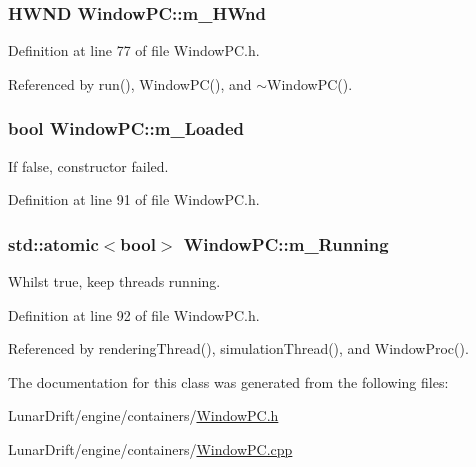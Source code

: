 \subsubsection[{\texorpdfstring{m\+\_\+\+H\+Wnd}{m_HWnd}}]{\setlength{\rightskip}{0pt plus 5cm}H\+W\+ND Window\+P\+C\+::m\+\_\+\+H\+Wnd\hspace{0.3cm}{\ttfamily [private]}}\hypertarget{class_window_p_c_a49b7d0fb393f4316e78dc753946fd5f9}{}\label{class_window_p_c_a49b7d0fb393f4316e78dc753946fd5f9}


Definition at line 77 of file Window\+P\+C.\+h.



Referenced by run(), Window\+P\+C(), and $\sim$\+Window\+P\+C().

\subsubsection[{\texorpdfstring{m\+\_\+\+Loaded}{m_Loaded}}]{\setlength{\rightskip}{0pt plus 5cm}bool Window\+P\+C\+::m\+\_\+\+Loaded\hspace{0.3cm}{\ttfamily [private]}}\hypertarget{class_window_p_c_a8fa7bd25448521da92f5b12a45392ded}{}\label{class_window_p_c_a8fa7bd25448521da92f5b12a45392ded}


If false, constructor failed. 



Definition at line 91 of file Window\+P\+C.\+h.

\subsubsection[{\texorpdfstring{m\+\_\+\+Running}{m_Running}}]{\setlength{\rightskip}{0pt plus 5cm}std\+::atomic$<$bool$>$ Window\+P\+C\+::m\+\_\+\+Running\hspace{0.3cm}{\ttfamily [private]}}\hypertarget{class_window_p_c_a5a79f6bf453401d1e1027e1de926083c}{}\label{class_window_p_c_a5a79f6bf453401d1e1027e1de926083c}


Whilst true, keep threads running. 



Definition at line 92 of file Window\+P\+C.\+h.



Referenced by rendering\+Thread(), simulation\+Thread(), and Window\+Proc().



The documentation for this class was generated from the following files\+:\begin{DoxyCompactItemize}
\item 
Lunar\+Drift/engine/containers/\hyperlink{_window_p_c_8h}{Window\+P\+C.\+h}\item 
Lunar\+Drift/engine/containers/\hyperlink{_window_p_c_8cpp}{Window\+P\+C.\+cpp}\end{DoxyCompactItemize}
